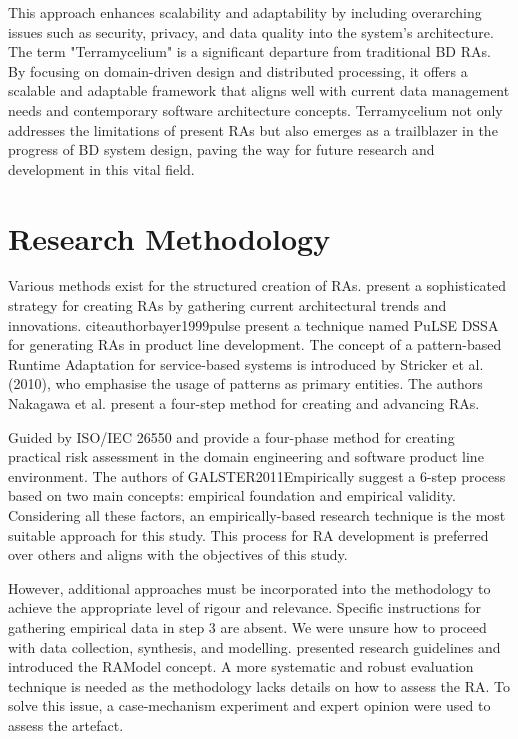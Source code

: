 \documentclass[preprint,12pt]{elsarticle}
\begin{document}
This approach enhances scalability and adaptability by including overarching issues such as security, privacy, and data quality into the system's architecture. The term "Terramycelium" is a significant departure from traditional BD RAs. By focusing on domain-driven design and distributed processing, it offers a scalable and adaptable framework that aligns well with current data management needs and contemporary software architecture concepts. Terramycelium not only addresses the limitations of present RAs but also emerges as a trailblazer in the progress of BD system design, paving the way for future research and development in this vital field.

\section{Research Methodology}

Various methods exist for the structured creation of RAs. \citeauthor{Cloutier2010} present a sophisticated strategy for creating RAs by gathering current architectural trends and innovations. citeauthorbayer1999pulse present a technique named PuLSE DSSA for generating RAs in product line development. The concept of a pattern-based Runtime Adaptation for service-based systems is introduced by Stricker et al. (2010), who emphasise the usage of patterns as primary entities. The authors Nakagawa et al. present a four-step method for creating and advancing RAs. 

Guided by ISO/IEC 26550 \citeauthor{wg2015iso} and \citeauthor{Derras} provide a four-phase method for creating practical risk assessment in the domain engineering and software product line environment. The authors of GALSTER2011Empirically suggest a 6-step process based on two main concepts: empirical foundation and empirical validity. Considering all these factors, an empirically-based research technique is the most suitable approach for this study. This process for RA development is preferred over others and aligns with the objectives of this study.

However, additional approaches must be incorporated into the methodology to achieve the appropriate level of rigour and relevance. Specific instructions for gathering empirical data in step 3 are absent. We were unsure how to proceed with data collection, synthesis, and modelling. \citeauthor{Nakagawa} presented research guidelines and introduced the RAModel concept. A more systematic and robust evaluation technique is needed as the methodology lacks details on how to assess the RA. To solve this issue, a case-mechanism experiment and expert opinion were used to assess the artefact.
\end{document}
